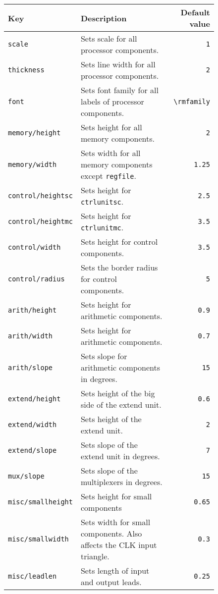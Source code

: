 \documentclass[.52pt,a4paper,titlepage]{article}
\begin{document}
\begin{figure}[htpb]
	\begin{tabular}{|llr|}
		\hline
		Key & Description & Default value\\
		\hline
		\texttt{scale} & Sets scale for all processor components. & \texttt{1}\\
		\texttt{thickness} & Sets line width for all processor components. & \texttt{2}\\
		\texttt{font} & Sets font family for all labels of processor components. & \verb|\rmfamily|\\
		\texttt{memory/height} & Sets height for all memory components.& \texttt{2}\\
		\texttt{memory/width} & Sets width for all memory components except \texttt{regfile}. & \texttt{1.25}\\
		\texttt{control/heightsc} & Sets height for \texttt{ctrlunitsc}. & \texttt{2.5}\\
		\texttt{control/heightmc} & Sets height for \texttt{ctrlunitmc}. & \texttt{3.5}\\
		\texttt{control/width} & Sets height for control components. & \texttt{3.5}\\
		\texttt{control/radius} & Sets the border radius for control components. & \texttt{5}\\
		\texttt{arith/height} & Sets height for arithmetic components. & \texttt{0.9}\\
		\texttt{arith/width} & Sets height for arithmetic components. & \texttt{0.7}\\
		\texttt{arith/slope} & Sets slope for arithmetic components in degrees. & \texttt{15}\\
		\texttt{extend/height} & Sets height of the big side of the extend unit. & \texttt{0.6}\\
		\texttt{extend/width} & Sets height of the extend unit. & \texttt{2}\\
		\texttt{extend/slope} & Sets slope of the extend unit in degrees. & \texttt{7}\\
		\texttt{mux/slope} & Sets slope of the multiplexers in degrees. & \texttt{15}\\
		\texttt{misc/smallheight} & Sets height for small components & \texttt{0.65}\\
		\texttt{misc/smallwidth} & Sets width for small components. Also affects the CLK input triangle. & \texttt{0.3}\\
		\texttt{misc/leadlen} & Sets length of input and output leads. & \texttt{0.25}\\
		\hline
	\end{tabular}
\end{figure}
\end{document}
